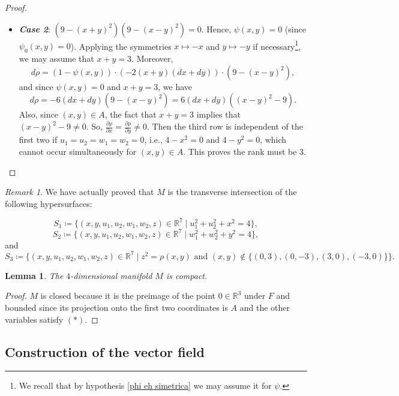 \documentclass[11pt,reqno]{amsart}
\theoremstyle{plain}
\newtheorem{lemma}[theorem]{Lemma}
\theoremstyle{definition}
\theoremstyle{remark}
\newtheorem{rmk}[theorem]{Remark}
\theoremstyle{plain}
\numberwithin{equation}{section}
\newcommand{\R}{\mathbb{R}}
\begin{document}
\begin{proof}
\begin{itemize}
									\item \textit{\textbf{Case 2}}: $(9-(x+y)^{2})(9-(x-y)^{2})=0.$ Hence, $\psi(x,y)=0$ (since $\psi_{0}(x,y)=0$). Applying the symmetries $x\mapsto -x$ and $y\mapsto -y$ if necessary\footnote{We recall that by hypothesis \ref{phi eh simetrica} we may assume it for $\psi$.}, we may assume that $x+y=3$. Moreover,
									$$d\rho=(1-\psi(x,y))\cdot (-2(x+y)(dx+dy))\cdot (9-(x-y)^{2}),$$
									and since $\psi(x,y)=0$ and $x+y=3$, we have $$d\rho=-6(dx+dy)(9-(x-y)^{2})=6(dx+dy)((x-y)^{2}-9).$$ Also, since $(x,y)\in A$, the fact that $x+y=3$ implies that $(x-y)^{2}-9\neq 0$. So, $\frac{\partial \rho}{\partial x}=\frac{\partial \rho}{\partial y}\neq 0$. Then the third row is independent of the first two if $u_{1}=u_{2}=w_{1}=w_{2}=0$, i.e., $4-x^{2}=0$ and $4-y^{2}=0$, which cannot occur simultaneously for $(x,y)\in A$. This proves the rank must be 3.
								\end{itemize}
							\end{proof}
							
							\begin{rmk}\label{rmk: variedades se intersectam transversalmente}
								We have actually proved that $M$ is the transverse intersection of the following hypersurfaces: 
								
								\[S_{1}\coloneqq \{(x,y,u_{1},u_{2},w_{1},w_{2},z)\in \R^{7}\mid u_{1}^{2}+u_{2}^{2}+x^{2}=4\}, \]
								\[S_{2}\coloneqq	\{(x,y,u_{1},u_{2},w_{1},w_{2},z)\in \R^{7}\mid w_{1}^{2}+w_{2}^{2}+y^{2}=4\},\]
								and 
								$$S_{3}\coloneqq\{(x,y,u_{1},u_{2},w_{1},w_{2},z) \in \R^{7}\mid z^{2}=\rho(x,y) \text{ and } (x,y) \notin \{(0,3),(0,-3),(3,0),(-3,0)\} \} .$$
							\end{rmk}
							
							\begin{lemma}\label{lemma: M e compact pra phi}
								The $4$-dimensional manifold $M$ is compact.
							\end{lemma}
							\begin{proof} $M$ is closed because it is the preimage of the point $0\in\R^3$ under $F$ and bounded since its projection onto the first two coordinates is $A$ and the other variables satisfy $(\ast)$. 
							\end{proof}
							
							\subsection{Construction of the vector field}
							
\end{document}

